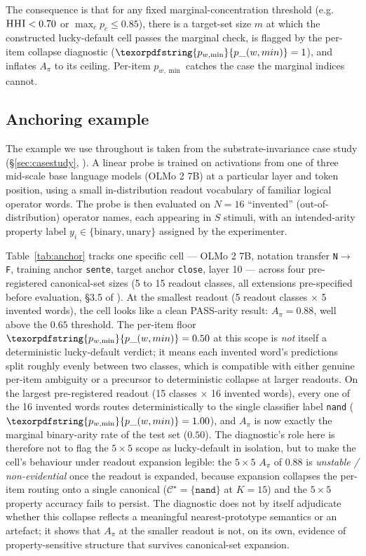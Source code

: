 \documentclass[11pt,letterpaper]{article}
\newcommand{\pwmin}{\texorpdfstring{\ensuremath{p_{w,\min}}}{p\_(w,min)}}
\newcommand{\hhi}{\textsc{HHI}}
\newcommand{\NtoF}{N$\to$F}
\begin{document}
The consequence is that for any fixed marginal-concentration
threshold (e.g.\ $\hhi < 0.70$ or $\max_c p_c \leq 0.85$), there is
a target-set size $m$ at which the constructed lucky-default cell
passes the marginal check, is flagged by the per-item collapse
diagnostic ($\pwmin = 1$), and inflates $A_\pi$ to its ceiling.
Per-item \pwmin{} catches the case the marginal indices cannot.

\subsection{Anchoring example}
\label{sec:anchor}

The example we use throughout is taken from the substrate-invariance
case study (\S\ref{sec:casestudy}, \citealp{budworth2026substrate}).
A linear probe is trained on activations from one of three mid-scale
base language models (OLMo 2 7B) at a particular layer and token
position, using a small in-distribution readout vocabulary of
familiar logical operator words. The probe is then evaluated on
$N = 16$ ``invented'' (out-of-distribution) operator names, each
appearing in $S$ stimuli, with an intended-arity property label
$y_i \in \{\text{binary}, \text{unary}\}$ assigned by the experimenter.

Table~\ref{tab:anchor} tracks one specific cell --- OLMo 2 7B,
notation transfer \texttt{\NtoF{}}, training anchor \texttt{sente},
target anchor \texttt{close}, layer 10 --- across four pre-registered
canonical-set sizes (5 to 15 readout classes, all extensions
pre-specified before evaluation, \S3.5 of
\citealp{budworth2026substrate}).
At the smallest readout (5 readout classes $\times$ 5 invented
words), the cell looks like a clean PASS-arity result:
$A_\pi = 0.88$, well above the $0.65$ threshold. The per-item floor
$\pwmin = 0.50$ at this scope is \emph{not} itself a deterministic
lucky-default verdict; it means each invented word's predictions
split roughly evenly between two classes, which is compatible with
either genuine per-item ambiguity or a precursor to deterministic
collapse at larger readouts. On the largest pre-registered readout
(15 classes $\times$ 16 invented words), every one of the 16
invented words routes deterministically to the single classifier
label \texttt{nand} ($\pwmin = 1.00$), and $A_\pi$ is now exactly
the marginal binary-arity rate of the test set ($0.50$). The
diagnostic's role here is therefore not to flag the $5 \times 5$
scope as lucky-default in isolation, but to make the cell's
behaviour under readout expansion legible: the $5 \times 5$
$A_\pi$ of $0.88$ is \emph{unstable / non-evidential} once the
readout is expanded, because expansion collapses the per-item
routing onto a single canonical
($\mathcal{C}^\star = \{\texttt{nand}\}$ at $K=15$) and the
$5 \times 5$ property accuracy fails to persist. The diagnostic
does not by itself adjudicate whether this collapse reflects a
meaningful nearest-prototype semantics or an artefact; it shows
that $A_\pi$ at the smaller readout is not, on its own, evidence
of property-sensitive structure that survives canonical-set
expansion.
\end{document}
